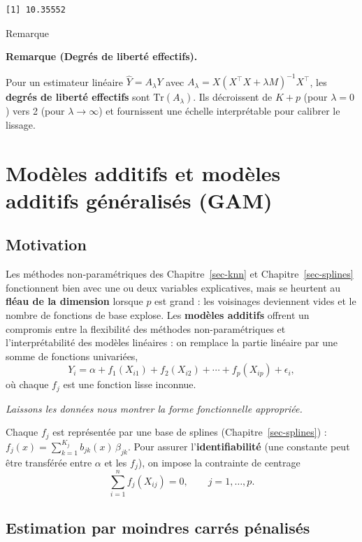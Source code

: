 \documentclass[
  french,
  letterpaper,
  DIV=11,
  numbers=noendperiod]{scrreprt}
\begin{document}
\begin{verbatim}
[1] 10.35552
\end{verbatim}

{Remarque}

\textbf{Remarque (Degrés de liberté effectifs).}

Pour un estimateur linéaire \(\hat Y = A_\lambda Y\) avec
\(A_\lambda = X(X^\top X + \lambda M)^{-1}X^\top\), les \textbf{degrés
de liberté effectifs} sont \(\mathrm{Tr}(A_\lambda)\). Ils décroissent
de \(K+p\) (pour \(\lambda = 0\)) vers 2 (pour \(\lambda\to\infty\)) et
fournissent une échelle interprétable pour calibrer le lissage.


\chapter{Modèles additifs et modèles additifs généralisés
(GAM)}\label{sec-gam}

\section{Motivation}\label{motivation}

Les méthodes non-paramétriques des Chapitre~\ref{sec-knn} et
Chapitre~\ref{sec-splines} fonctionnent bien avec une ou deux variables
explicatives, mais se heurtent au \textbf{fléau de la dimension} lorsque
\(p\) est grand : les voisinages deviennent vides et le nombre de
fonctions de base explose. Les \textbf{modèles additifs} offrent un
compromis entre la flexibilité des méthodes non-paramétriques et
l'interprétabilité des modèles linéaires : on remplace la partie
linéaire par une somme de fonctions univariées,
\[Y_i = \alpha + f_1(X_{i1}) + f_2(X_{i2}) + \cdots + f_p(X_{ip}) + \epsilon_i,\]
où chaque \(f_j\) est une fonction lisse inconnue.

\emph{Laissons les données nous montrer la forme fonctionnelle
appropriée.}

Chaque \(f_j\) est représentée par une base de splines
(Chapitre~\ref{sec-splines}) :
\(f_j(x) = \sum_{k=1}^{K_j} b_{jk}(x)\,\beta_{jk}\). Pour assurer
l'\textbf{identifiabilité} (une constante peut être transférée entre
\(\alpha\) et les \(f_j\)), on impose la contrainte de centrage
\[\sum_{i=1}^n f_j(X_{ij}) = 0, \qquad j = 1,\ldots,p.\]

\section{Estimation par moindres carrés
pénalisés}\label{estimation-par-moindres-carruxe9s-puxe9nalisuxe9s}
\end{document}
